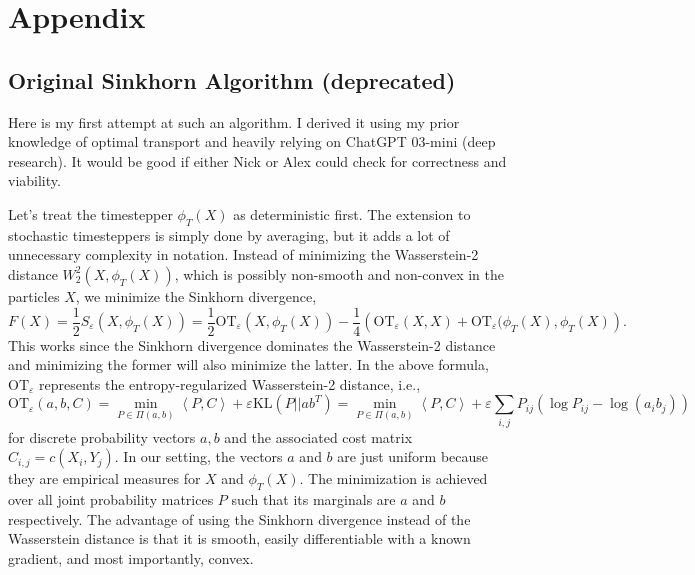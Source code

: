 \section{Appendix}
\subsection{Original Sinkhorn Algorithm (deprecated)} \label{subsec:particle_algorithm}
Here is my first attempt at such an algorithm. I derived it using my prior knowledge of optimal transport and heavily relying on ChatGPT 03-mini (deep research). It would be good if either Nick or Alex could check for correctness and viability.

Let's treat the timestepper $\phi_T(X)$ as deterministic first. The extension to stochastic timesteppers is simply done by averaging, but it adds a lot of unnecessary complexity in notation. Instead of minimizing the Wasserstein-2 distance $W_2^2(X, \phi_T(X))$, which is possibly non-smooth and non-convex in the particles $X$, we minimize the Sinkhorn divergence,
\begin{equation}
    F(X) = \frac{1}{2}S_{\varepsilon}(X, \phi_T(X)) = \frac{1}{2}\text{OT}_\varepsilon(X, \phi_T(X)) - \frac{1}{4}\left(\text{OT}_\varepsilon(X,X) + \text{OT}_{\varepsilon}(\phi_T(X), \phi_T(X)\right).
\end{equation}
This works since the Sinkhorn divergence dominates the Wasserstein-2 distance and minimizing the former will also minimize the latter. In the above formula, $\text{OT}_\varepsilon$ represents the entropy-regularized Wasserstein-2 distance, i.e., 
\begin{equation} \label{eq:regularized_OT_loss}
    \text{OT}_\varepsilon(a, b, C) = \underset{P \in \Pi(a,b)}{\min} \left\langle P, C\right\rangle + \varepsilon \text{KL}\left(P || a b^T\right) = \underset{P \in \Pi(a,b)}{\min} \left\langle P, C\right\rangle + \varepsilon \sum_{i,j} P_{ij} \left(\log P_{ij} -  \log(a_i b_j)\right)
\end{equation}
for discrete probability vectors $a, b$ and the associated cost matrix $C_{i,j} = c(X_i, Y_j)$. In our setting, the vectors $a$ and $b$ are just uniform because they are empirical measures for $X$ and $\phi_T(X)$. The minimization is achieved over all joint probability matrices $P$ such that its marginals are $a$ and $b$ respectively. The advantage of using the Sinkhorn divergence instead of the Wasserstein distance is that it is smooth, easily differentiable with a known gradient, and most importantly, convex.

